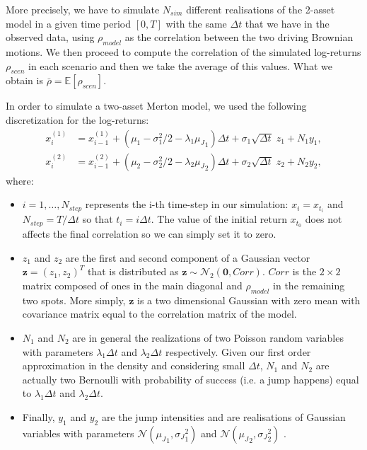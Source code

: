 More precisely, we have to simulate $N_{sim}$ different realisations of the 2-asset model in a given time period $[0, T]$ with the same $\Delta t$ that we have in the observed data, using $\rho_{model}$ as the correlation between the two driving Brownian motions. We then proceed to compute the correlation of the simulated log-returns $\rho_{scen}$ in each scenario and then we take the average of this values. What we obtain is $\bar{\rho} = \mathbb{E}[\rho_{scen}] $.

In order to simulate a two-asset Merton model, we used the following discretization for the log-returns:
\begin{subequations}
	\label{eq:merton_discretization}
	\begin{align}
	x_i^{(1)} &= x_{i-1}^{(1)} + (\mu_1 - \sigma_1^2/2 -\lambda_1 {\mu_J}_1) \Delta t + \sigma_1 \sqrt{\Delta t} \;  z_1 + N_1 {y}_1 ,\\
	x_i^{(2)} &= x_{i-1}^{(2)} + (\mu_2 - \sigma_2^2/2 -\lambda_2 {\mu_J}_2) \Delta t + \sigma_2 \sqrt{\Delta t} \; z_2 + N_2 {y}_2 ,
	\end{align}
\end{subequations} 
where:
\begin{itemize}
	\item $i = 1, \dots , N_{step}$ represents the i-th time-step in our simulation: $x_i = x_{t_i}$ and $N_{step} = T / \Delta t$ so that $t_i = i \Delta t$. The value of the initial return $x_{t_0}$ does not affects the final correlation so we can simply set it to zero.
	\item $z_1$ and $z_2$ are the first and second component of a Gaussian vector $\mathbf{z} = (z_1,z_2)^T$ that is distributed as $\mathbf{z} \sim \mathcal{N}_2(\mathbf{0}, Corr)$. $Corr$ is the $2 \times 2$ matrix composed of ones in the main diagonal and $\rho_{model}$ in the remaining two spots. 
	More simply, $\mathbf{z}$ is a two dimensional Gaussian with zero mean with covariance matrix equal to the correlation matrix of the model.
	\item $N_1$ and $N_2$ are in general the realizations of two Poisson random variables with parameters $\lambda_1 \Delta t$ and $\lambda_2 \Delta t$ respectively. Given our first order approximation in the density and considering small $\Delta t$,  $N_1$ and $N_2$ are actually two Bernoulli with probability of success (i.e. a jump happens) equal to $\lambda_1 \Delta t$ and $\lambda_2 \Delta t$.
	\item Finally, $y_1$ and $y_2$ are the jump intensities and are realisations of Gaussian variables with parameters $\mathcal{N}({\mu_J}_1, {\sigma_J}_1^2)$ and $\mathcal{N}({\mu_J}_2, {\sigma_J}_2^2)$ . 
\end{itemize}

